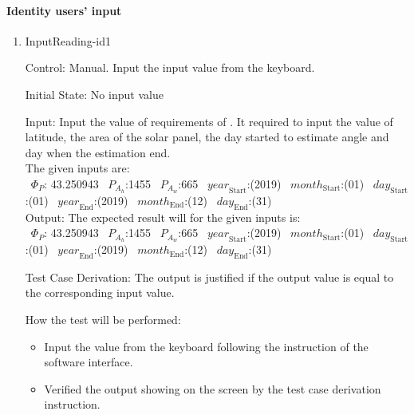 \documentclass[12pt, titlepage]{article}
\begin{document}
\paragraph{Identity users' input}
\begin{enumerate}

\item{InputReading-id1\\}

Control: Manual. Input the input value from the keyboard.
					
Initial State: No input value
					
Input: Input the value of requirements of \progname. It required to input the
value of latitude, the area of the solar panel, the day started to estimate
angle and day when the estimation end.\\

 The given inputs are:\\
 ~$\Phi_P$: 43.250943 
~$P_{A_{h}}$:1455
~$P_{A_{w}}$:665
~$\mathit{year}_\text{Start}$:(2019) ~$\mathit{month}_\text{Start}$:(01) 
~$\mathit{day}_\text{Start}$:(01) ~$\mathit{year}_\text{End}$:(2019) 
~$\mathit{month}_\text{End}$:(12) 
~$\mathit{day}_\text{End}$:(31)\\

 Output: The expected result will for the given inputs is:\\ 
~$\Phi_P$: 43.250943
~$P_{A_{h}}$:1455
~$P_{A_{w}}$:665
~$\mathit{year}_\text{Start}$:(2019) 
~$\mathit{month}_\text{Start}$:(01) 
~$\mathit{day}_\text{Start}$:(01) 
~$\mathit{year}_\text{End}$:(2019) 
~$\mathit{month}_\text{End}$:(12) 
~$\mathit{day}_\text{End}$:(31)\\


Test Case Derivation: The output is justified if the output value is equal to
the corresponding input value.

How the test will be performed:
\begin{itemize}
\item Input the value from the keyboard following the instruction of the
software interface.
\item Verified the output showing on the screen by the test case derivation
instruction. 
\end{itemize}
\end{enumerate}

  
\end{document}
